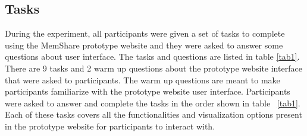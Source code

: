 \documentclass[mscthesis]{usiinfthesis}
\begin{document}
\subsection{Tasks}

During the experiment, all participants were given a set of tasks to complete using the MemShare prototype website and they were asked to answer some questions about user interface. The tasks and questions are listed in table \ref{tab1}. There are 9 tasks and 2 warm up questions about the prototype website interface that were asked to participants. The warm up questions are meant to make participants familiarize with the prototype website user interface. Participants were asked to answer and complete the tasks in the order shown in table ~\ref{tab1}. Each of these tasks covers all the functionalities and visualization options present in the prototype website for participants to interact with. 
\end{document}
